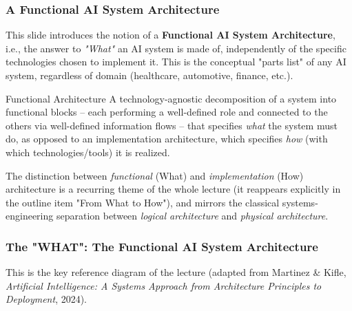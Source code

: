 \subsubsection{A Functional AI System Architecture}

This slide introduces the notion of a \textbf{Functional AI System Architecture}, i.e., the answer to \emph{"What"} an AI system is made of, independently of the specific technologies chosen to implement it. This is the conceptual "parts list" of any AI system, regardless of domain (healthcare, automotive, finance, etc.).

\begin{defbox}{Functional Architecture}
A technology-agnostic decomposition of a system into functional blocks -- each performing a well-defined role and connected to the others via well-defined information flows -- that specifies \emph{what} the system must do, as opposed to an implementation architecture, which specifies \emph{how} (with which technologies/tools) it is realized.
\end{defbox}

The distinction between \emph{functional} (What) and \emph{implementation} (How) architecture is a recurring theme of the whole lecture (it reappears explicitly in the outline item "From What to How"), and mirrors the classical systems-engineering separation between \emph{logical architecture} and \emph{physical architecture}.

\subsubsection*{The "WHAT": The Functional AI System Architecture}

This is the key reference diagram of the lecture (adapted from Martinez \& Kifle, \emph{Artificial Intelligence: A Systems Approach from Architecture Principles to Deployment}, 2024).

\vspace{0.3cm}


